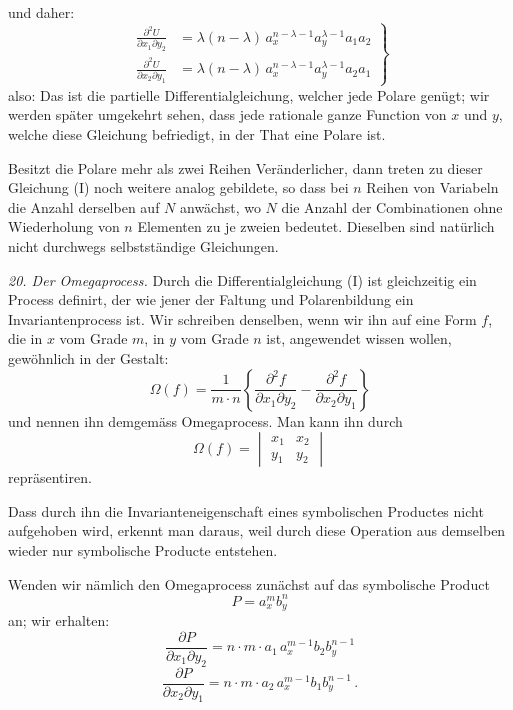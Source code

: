 und daher:
\[
\left.\begin{aligned}
\frac{\partial^2 U}{\partial x_1\partial y_2} &= \lambda(n-\lambda)\,a_x^{n-\lambda-1}a_y^{\lambda-1}a_1a_2 \\
\frac{\partial^2 U}{\partial x_2\partial y_1} &= \lambda(n-\lambda)\,a_x^{n-\lambda-1}a_y^{\lambda-1}a_2a_1
\end{aligned}\right\}
\]
also:
Das ist die partielle Differentialgleichung, welcher jede Polare genügt; wir werden später umgekehrt sehen, dass jede rationale ganze Function von $x$ und $y$, welche diese Gleichung befriedigt, in der That eine Polare ist.

Besitzt die Polare mehr als zwei Reihen Veränderlicher, dann treten zu dieser Gleichung (I) noch weitere analog gebildete, so dass bei $n$ Reihen von Variabeln die Anzahl derselben auf $N$ anwächst, wo $N$ die Anzahl der Combinationen ohne Wiederholung von $n$ Elementen zu je zweien bedeutet. Dieselben sind natürlich nicht durchwegs selbstständige Gleichungen.

\textit{20. Der Omegaprocess.} Durch die Differentialgleichung (I) ist gleichzeitig ein Process definirt, der wie jener der Faltung und Polarenbildung ein Invariantenprocess ist. Wir schreiben denselben, wenn wir ihn auf eine Form $f$, die in $x$ vom Grade $m$, in $y$ vom Grade $n$ ist, angewendet wissen wollen, gewöhnlich in der Gestalt:
\[
\Omega(f) = \frac{1}{m\cdot n}\left\{\frac{\partial^2 f}{\partial x_1\partial y_2} - \frac{\partial^2 f}{\partial x_2\partial y_1}\right\}
\]
und nennen ihn demgemäss Omegaprocess. Man kann ihn durch
\[
\Omega(f) = \begin{vmatrix} x_1 & x_2 \\ y_1 & y_2 \end{vmatrix}
\]
repräsentiren.

Dass durch ihn die Invarianteneigenschaft eines symbolischen Productes nicht aufgehoben wird, erkennt man daraus, weil durch diese Operation aus demselben wieder nur symbolische Producte entstehen.

Wenden wir nämlich den Omegaprocess zunächst auf das symbolische Product
\[
P = a_x^m b_y^n
\]
an; wir erhalten:
\[
\frac{\partial P}{\partial x_1\partial y_2} = n\cdot m\cdot a_1\,a_x^{m-1}b_2b_y^{n-1}
\]
\[
\frac{\partial P}{\partial x_2\partial y_1} = n\cdot m\cdot a_2\,a_x^{m-1}b_1b_y^{n-1}\,.
\]


